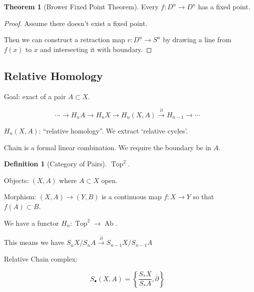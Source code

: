 \documentclass{article}
\theoremstyle{definition}
\newtheorem*{definition}{Definition}
\newtheorem{theorem}{Theorem}
\begin{document}
    \begin{theorem}
        [Brower Fixed Point Theorem] Every \(f: D^n \to D^n\) has a fixed point.
    \end{theorem}

    \begin{proof}
        Assume there doesn't exist a fixed point.

        Then we can construct a retraction map \(r: D^n \to S^n\) by drawing a line from \(f(x)\) to \(x\) and intersecting it with boundary.
    \end{proof}

    \subsection*{Relative Homology}

    Goal: exact of a pair \(A \subset X\).

    \[
        \cdots \to H_n A \to H_n X \to H_n(X,A) \xrightarrow{\partial} H_{n-1} \to \cdots 
    \]

    \(H_n(X,A)\): ``relative homology''. We extract `relative cycles'.

    Chain is a formal linear combination. We require the boundary be in \(A\).

    \begin{definition}
        [Category of Pairs] \(\operatorname{Top}^2\).

        Objects: \((X,A)\) where \(A \subset X\) open.

        Morphism: \((X,A) \to (Y,B)\) is a continuous map \(f: X \to Y\) so that \(f(A) \subset B\).
    \end{definition}

    We have a functor \(H_n: \operatorname{Top}^2 \to \operatorname{Ab}\).

    \begin{center}
    \end{center}

    This means we have \(S_n X / S_n A \xrightarrow{\overline{\partial }} S_{n-1} X / S_{n-1} A\) 

    Relative Chain complex:

    \[
        S_\bullet(X,A) = \left\{ \frac{S_{\ast} X}{S_{\ast} A}, \overline{\partial } \right\} 
    \]
\end{document}
